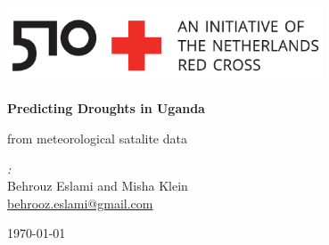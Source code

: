 \documentclass[10pt,parskip=half,
toc=sectionentrywithdots,
bibliography=totocnumbered,
captions=tableheading,numbers=noendperiod]{scrartcl}
\begin{document}
    \begin{titlepage}
  \begin{flushright}
    \includegraphics[width=0.7\textwidth]{Uganda_logit_model_files/510logo.png}
  \end{flushright}

  \begin{center}

  \vspace*{1cm}

  \Huge\textbf{Predicting Droughts in Uganda}

  \vspace{0.5cm}\LARGE{from meteorological satalite data}

  \vspace{1.5cm}

  \begin{minipage}{0.8\textwidth}
    \begin{center}
    \begin{minipage}{0.39\textwidth}
    \begin{flushleft} \Large
    \emph{:}\\Behrouz Eslami and Misha Klein\\\href{mailto:behrooz.eslami@gmail.com}{behrooz.eslami@gmail.com}
    \end{flushleft}
    \end{minipage}
    \hspace{\fill}
    \begin{minipage}{0.39\textwidth}
    \begin{flushright} \Large
    \end{flushright}
    \end{minipage}
    \end{center}
  \end{minipage}

  \vfill

  \begin{minipage}{0.8\textwidth}
  \begin{center}
  \end{center}
  \end{minipage}

  \vspace{0.8cm}

  \vspace{0.4cm}

  \today

  \end{center}
  \end{titlepage}
\end{document}
